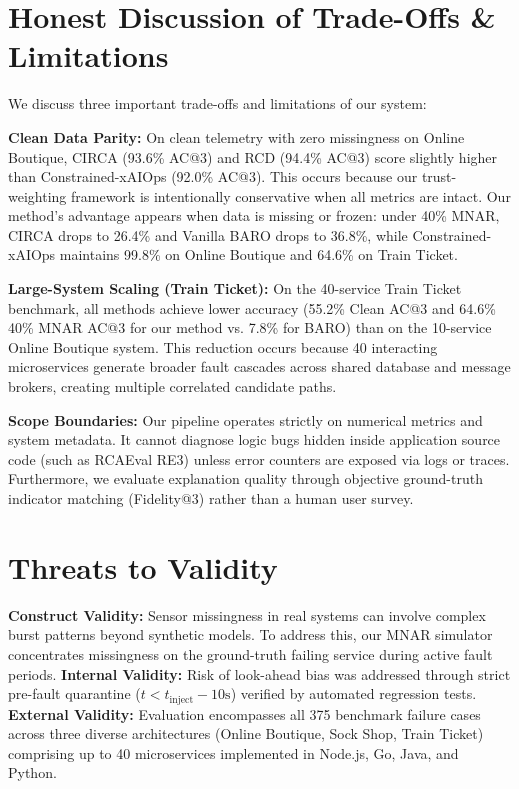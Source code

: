 \documentclass[conference]{IEEEtran}
\begin{document}
\section{Honest Discussion of Trade-Offs \& Limitations}
We discuss three important trade-offs and limitations of our system:

\textbf{Clean Data Parity:} On clean telemetry with zero missingness on Online Boutique, CIRCA (93.6\% AC@3) and RCD (94.4\% AC@3) score slightly higher than Constrained-xAIOps (92.0\% AC@3).
This occurs because our trust-weighting framework is intentionally conservative when all metrics are intact.
Our method's advantage appears when data is missing or frozen: under 40\% MNAR, CIRCA drops to 26.4\% and Vanilla BARO drops to 36.8\%, while Constrained-xAIOps maintains 99.8\% on Online Boutique and 64.6\% on Train Ticket.

\textbf{Large-System Scaling (Train Ticket):} On the 40-service Train Ticket benchmark, all methods achieve lower accuracy (55.2\% Clean AC@3 and 64.6\% 40\% MNAR AC@3 for our method vs. 7.8\% for BARO) than on the 10-service Online Boutique system.
This reduction occurs because 40 interacting microservices generate broader fault cascades across shared database and message brokers, creating multiple correlated candidate paths.

\textbf{Scope Boundaries:} Our pipeline operates strictly on numerical metrics and system metadata.
It cannot diagnose logic bugs hidden inside application source code (such as RCAEval RE3) unless error counters are exposed via logs or traces.
Furthermore, we evaluate explanation quality through objective ground-truth indicator matching (Fidelity@3) rather than a human user survey.

\section{Threats to Validity}
\textbf{Construct Validity:} Sensor missingness in real systems can involve complex burst patterns beyond synthetic models.
To address this, our MNAR simulator concentrates missingness on the ground-truth failing service during active fault periods.
\textbf{Internal Validity:} Risk of look-ahead bias was addressed through strict pre-fault quarantine ($t < t_{\text{inject}} - 10\text{s}$) verified by automated regression tests.
\textbf{External Validity:} Evaluation encompasses all 375 benchmark failure cases across three diverse architectures (Online Boutique, Sock Shop, Train Ticket) comprising up to 40 microservices implemented in Node.js, Go, Java, and Python.
\end{document}
